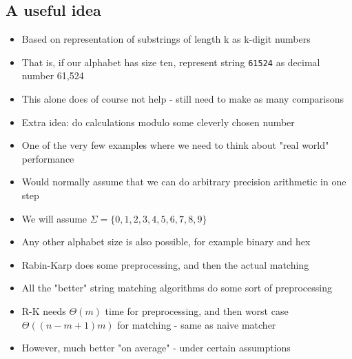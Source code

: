 \documentclass{article}[18pt]
\begin{document}
\subsection{A useful idea}
\begin{itemize}
	\item Based on representation of substrings of length k as k-digit numbers
	\item That is, if our alphabet has size ten, represent string \texttt{61524} as decimal number 61,524
	\item This alone does of course not help - still need to make as many comparisons
	\item Extra idea: do calculations modulo some cleverly chosen number
	\item One of the very few examples where we need to think about "real world" performance
	\item Would normally assume that we can do arbitrary precision arithmetic in one step
	\item We will assume $\Sigma=\{0,1,2,3,4,5,6,7,8,9\}$
	\item Any other alphabet size is also possible, for example binary and hex
	\item Rabin-Karp does some preprocessing, and then the actual matching
	\item All the "better" string matching algorithms do some sort of preprocessing
	\item R-K needs $\Theta(m)$ time for preprocessing, and then worst case $\Theta((n-m+1)m)$ for matching - same as naive matcher
	\item However, much better "on average" - under certain assumptions
\end{itemize}
\end{document}
